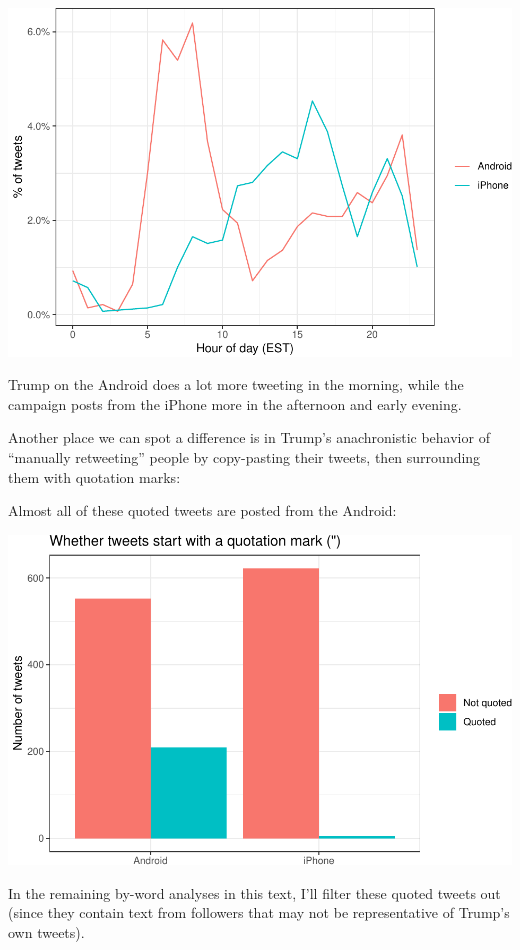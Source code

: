 \documentclass[
]{article}
\begin{document}
\includegraphics{Live_Demo_files/figure-latex/unnamed-chunk-2-1.pdf}

Trump on the Android does a lot more tweeting in the morning, while the
campaign posts from the iPhone more in the afternoon and early evening.

Another place we can spot a difference is in Trump's anachronistic
behavior of ``manually retweeting'' people by copy-pasting their tweets,
then surrounding them with quotation marks:

Almost all of these quoted tweets are posted from the Android:

\includegraphics{Live_Demo_files/figure-latex/unnamed-chunk-3-1.pdf}

In the remaining by-word analyses in this text, I'll filter these quoted
tweets out (since they contain text from followers that may not be
representative of Trump's own tweets).
\end{document}
